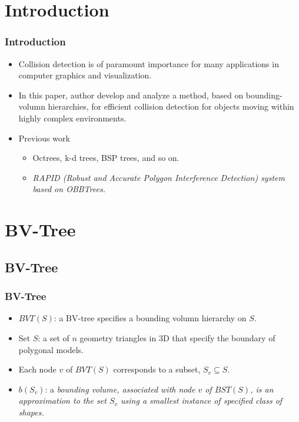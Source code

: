 \documentclass{beamer}
\begin{document}
\section{Introduction}
    \begin{frame}
    \frametitle{Introduction}
	\begin{itemize}
		\item Collision detection is of paramount importance for many applications in computer graphics and visualization.
		\item In this paper, author develop and analyze a method, based on bounding-volumn hierarchies, for efficient collision detection for objects moving within highly complex environments.
		\item Previous work
			\begin{itemize}
			\item Octrees, k-d trees, BSP trees, and so on.
			\item \it{RAPID} (Robust and Accurate Polygon Interference Detection) system based on \it{OBBTrees}.
			\end{itemize}
	\end{itemize}
    \end{frame}

\section{BV-Tree}

\subsection{BV-Tree}
	\begin{frame}
	\frametitle{BV-Tree}
		\begin{itemize}
			\item $BVT(S)$: a BV-tree specifies a bounding volumn hierarchy on $S$.
			\item Set $S$: a set of $n$ geometry triangles in 3D that specify the boundary of polygonal models.
			\item Each node $v$ of $BVT(S)$ corresponds to a subset, $S_{v} \subseteq S$.
			\item $b(S_{v})$: a \it{bounding volume}, associated with node $v$ of $BST(S)$, is an approximation to the set $S_{v}$ using a smallest instance of specified class of shapes.
		\end{itemize}
	\end{frame}
\end{document}
